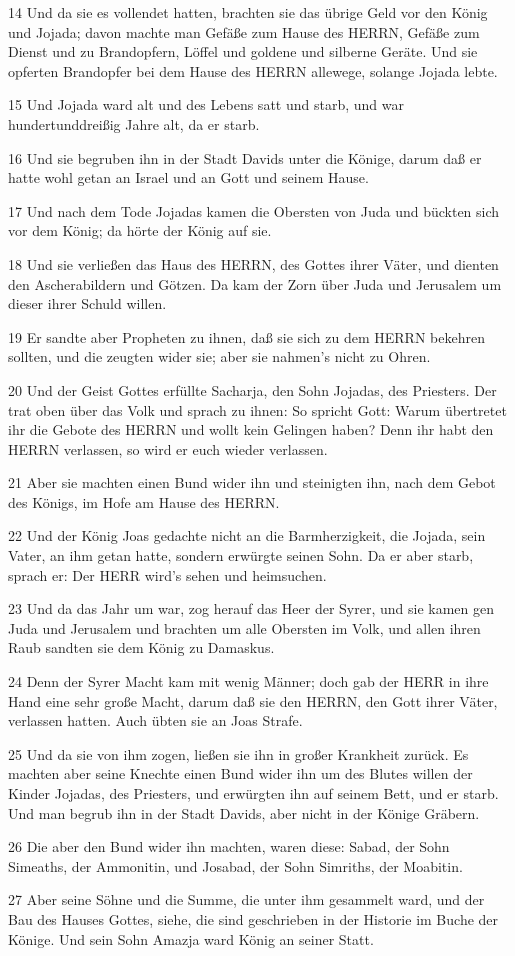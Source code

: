 \par 14 Und da sie es vollendet hatten, brachten sie das übrige Geld vor den König und Jojada; davon machte man Gefäße zum Hause des HERRN, Gefäße zum Dienst und zu Brandopfern, Löffel und goldene und silberne Geräte. Und sie opferten Brandopfer bei dem Hause des HERRN allewege, solange Jojada lebte.
\par 15 Und Jojada ward alt und des Lebens satt und starb, und war hundertunddreißig Jahre alt, da er starb.
\par 16 Und sie begruben ihn in der Stadt Davids unter die Könige, darum daß er hatte wohl getan an Israel und an Gott und seinem Hause.
\par 17 Und nach dem Tode Jojadas kamen die Obersten von Juda und bückten sich vor dem König; da hörte der König auf sie.
\par 18 Und sie verließen das Haus des HERRN, des Gottes ihrer Väter, und dienten den Ascherabildern und Götzen. Da kam der Zorn über Juda und Jerusalem um dieser ihrer Schuld willen.
\par 19 Er sandte aber Propheten zu ihnen, daß sie sich zu dem HERRN bekehren sollten, und die zeugten wider sie; aber sie nahmen's nicht zu Ohren.
\par 20 Und der Geist Gottes erfüllte Sacharja, den Sohn Jojadas, des Priesters. Der trat oben über das Volk und sprach zu ihnen: So spricht Gott: Warum übertretet ihr die Gebote des HERRN und wollt kein Gelingen haben? Denn ihr habt den HERRN verlassen, so wird er euch wieder verlassen.
\par 21 Aber sie machten einen Bund wider ihn und steinigten ihn, nach dem Gebot des Königs, im Hofe am Hause des HERRN.
\par 22 Und der König Joas gedachte nicht an die Barmherzigkeit, die Jojada, sein Vater, an ihm getan hatte, sondern erwürgte seinen Sohn. Da er aber starb, sprach er: Der HERR wird's sehen und heimsuchen.
\par 23 Und da das Jahr um war, zog herauf das Heer der Syrer, und sie kamen gen Juda und Jerusalem und brachten um alle Obersten im Volk, und allen ihren Raub sandten sie dem König zu Damaskus.
\par 24 Denn der Syrer Macht kam mit wenig Männer; doch gab der HERR in ihre Hand eine sehr große Macht, darum daß sie den HERRN, den Gott ihrer Väter, verlassen hatten. Auch übten sie an Joas Strafe.
\par 25 Und da sie von ihm zogen, ließen sie ihn in großer Krankheit zurück. Es machten aber seine Knechte einen Bund wider ihn um des Blutes willen der Kinder Jojadas, des Priesters, und erwürgten ihn auf seinem Bett, und er starb. Und man begrub ihn in der Stadt Davids, aber nicht in der Könige Gräbern.
\par 26 Die aber den Bund wider ihn machten, waren diese: Sabad, der Sohn Simeaths, der Ammonitin, und Josabad, der Sohn Simriths, der Moabitin.
\par 27 Aber seine Söhne und die Summe, die unter ihm gesammelt ward, und der Bau des Hauses Gottes, siehe, die sind geschrieben in der Historie im Buche der Könige. Und sein Sohn Amazja ward König an seiner Statt.

